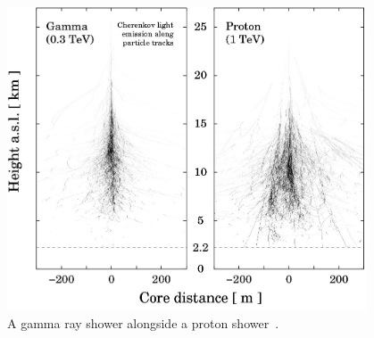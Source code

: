   \begin{figure}[ht]
    \centering
    \includegraphics[width=0.95\textwidth]{images/showers_gamma_proton}
    \caption[Gamma Ray and Proton Showers]{
      A gamma ray shower alongside a proton shower~\cite{Bernlohr2008149}.
    }
    \label{fig:gamma_vs_proton_airshower}
  \end{figure}

